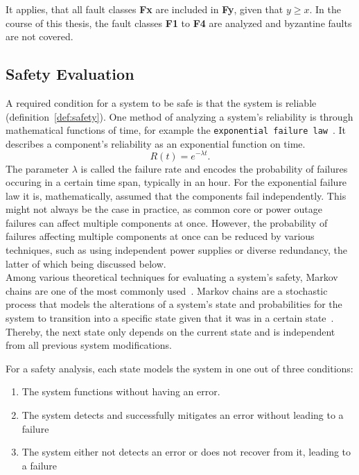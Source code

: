 It applies, that all fault classes \textbf{Fx} are included in \textbf{Fy}, given that $y \geq x$.
In the course of this thesis, the fault classes \textbf{F1} to \textbf{F4} are analyzed and byzantine faults are not covered.

\subsection{Safety Evaluation}
\label{sec:safetyEvaluation}
A required condition for a system to be safe is that the system is reliable (definition~\autoref{def:safety}).
One method of analyzing a system's reliability is through mathematical functions of time, for example the \texttt{exponential failure law}~\cite{GeffroyMotetDependableComputing}.
It describes a component's reliability as an exponential function on time.
\begin{equation}
R(t) = e^{-\lambda t}.
\label{eq:expFailureLaw}
\end{equation}
The parameter $\lambda$ is called the failure rate and encodes the probability of failures occuring in a certain time span, typically in an hour.
For the exponential failure law it is, mathematically, assumed that the components fail independently.
This might not always be the case in practice, as common core or power outage failures can affect multiple components at once.
However, the probability of failures affecting multiple components at once can be reduced by various techniques, such as using independent power supplies or diverse redundancy, the latter of which being discussed below.
\\

Among various theoretical techniques for evaluating a system's safety, Markov chains are one of the most commonly used~\cite{BarryFaultToleranceAnalysis}.
Markov chains are a stochastic process that models the alterations of a system's state and probabilities for the system to transition into a specific state given that it was in a certain state~\cite{KemenyMarkovChains}.
Thereby, the next state only depends on the current state and is independent from all previous system modifications.

For a safety analysis, each state models the system in one out of three conditions:
\begin{enumerate}
\item The system functions without having an error.
\item The system detects and successfully mitigates an error without leading to a failure
\item The system either not detects an error or does not recover from it, leading to a failure
\end{enumerate}

